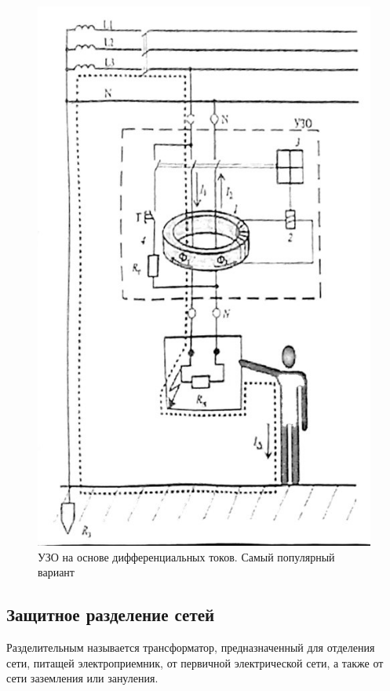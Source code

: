 \documentclass[a4paper, 14pt]{extarticle}
\begin{document}
\begin{figure}[h]
    \centering
    \includegraphics[height=\textheight]{./img/L5/S006.jpg}
    \caption{УЗО на основе дифференциальных токов. Самый популярный вариант}
\end{figure}

\FloatBarrier{}
\subsection{Защитное разделение сетей}
Разделительным называется трансформатор, предназначенный для отделения сети, питащей электроприемник, от первичной электрической сети, а также от сети заземления или зануления.
\end{document}
